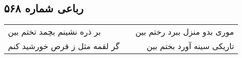 \begin{center}
\section*{رباعی شماره ۵۶۸}
\label{sec:sh568}
\begin{longtable}{l p{0.5cm} r}
بر ذره نشینم بچمد تختم بین
&&
موری بدو منزل ببرد رختم بین
\\
گر لقمه مثل ز قرص خورشید کنم
&&
تاریکی سینه آورد بختم بین
\\
\end{longtable}
\end{center}
